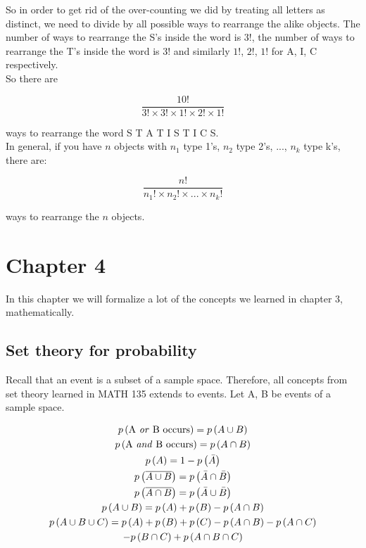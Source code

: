 \documentclass[12pt, letterpaper]{article}
\begin{document}
So in order to get rid of the over-counting we did by treating all letters as distinct, we need to divide by all possible ways to rearrange the alike objects. The number of ways to rearrange the S's inside the word is \(3!\), the number of ways to rearrange the T's inside the word is \(3!\) and similarly \(1!\), \(2!\), \(1!\) for A, I, C respectively.\\

So there are 

\[
\frac{10!}{3! \times 3! \times 1! \times 2! \times 1!}
\]

ways to rearrange the word S T A T I S T I C S.\\

In general, if you have \(n\) objects with \(n_1\) type 1's, \(n_2\) type 2's, ..., \(n_k\) type k's, there are:

\[
\frac{n!}{n_1! \times n_2! \times ... \times n_k!}
\]

ways to rearrange the \(n\) objects.

\newpage

\section{Chapter 4}
In this chapter we will formalize a lot of the concepts we learned in chapter 3, mathematically.

\subsection{Set theory for probability}
Recall that an event is a subset of a sample space. Therefore, all concepts from set theory learned in MATH 135 extends to events. Let A, B be events of a sample space.

\begin{gather*}
p\left(\text{A \emph{or} B occurs}\right) = p\left(A \cup B\right)\\
p\left(\text{A \emph{and} B occurs}\right) = p\left(A \cap B\right)\\
p\left(A\right) = 1 - p\left(\bar{A}\right)\\
p\left(\overline{{A \cup B}}\right) = p\left(\bar{A} \cap \bar{B}\right)\\
p\left(\overline{{A \cap B}}\right) = p\left(\bar{A} \cup \bar{B}\right)\\
p\left(A \cup B \right) = p\left(A\right) + p\left(B\right) - p\left(A \cap B\right)\\
p\left(A \cup B \cup C\right) = p\left(A\right) + p\left(B\right) + p\left(C\right) - p\left(A \cap B\right) - p\left(A \cap C\right)\\ - p\left(B \cap C\right) + p\left(A \cap B \cap C\right)\\
\end{gather*}
\end{document}
